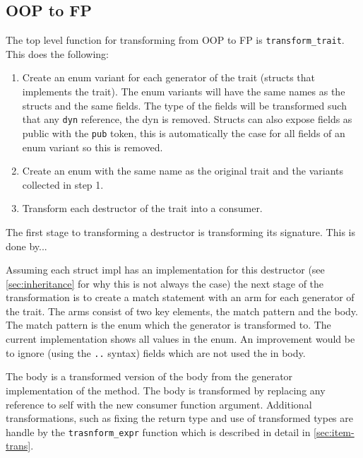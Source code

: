 \documentclass[ oneside,%
                    author={James Elgar},
                    degree={MEng},
                     title={Bidirectional transformer between functional and \\ object-oriented programming in Rust},
                  subtitle={}]{dissertation}
\begin{document}
\subsection{OOP to FP}

The top level function for transforming from OOP to FP is \verb|transform_trait|. This does the following:

\begin{enumerate}
    \item  Create an enum variant for each generator of the trait (structs that implements the trait). The enum variants will have the same names as the structs and the same fields. The type of the fields will be transformed such that any \verb|dyn| reference, the dyn is removed. Structs can also expose fields as public with the \verb|pub| token, this is automatically the case for all fields of an enum variant so this is removed.
    \item Create an enum with the same name as the original trait and the variants collected in step 1.
    \item Transform each destructor of the trait into a consumer.
\end{enumerate}

The first stage to transforming a destructor is transforming its signature. This is done by...

Assuming each struct impl has an implementation for this destructor (see \autoref{sec:inheritance} for why this is not always the case) the next stage of the transformation is to create a match statement with an arm for each generator of the trait. The arms consist of two key elements, the match pattern and the body. The match pattern is the enum which the generator is transformed to. The current implementation shows all values in the enum. An improvement would be to ignore (using the \verb|..| syntax) fields which are not used the in body.

The body is a transformed version of the body from the generator implementation of the method. The body is transformed by replacing any reference to self with the new consumer function argument.
Additional transformations, such as fixing the return type and use of transformed types are handle by the \verb|trasnform_expr| function which is described in detail in \autoref{sec:item-trans}.

\end{document}
